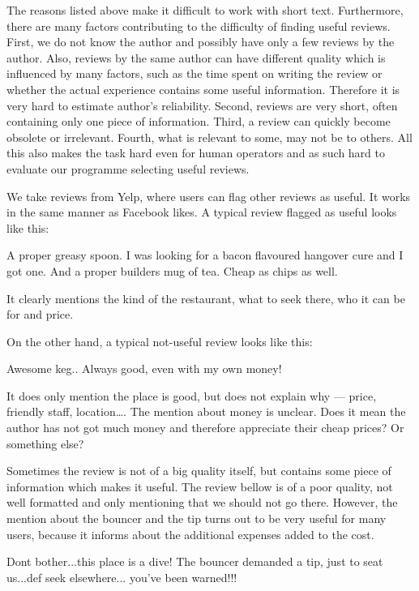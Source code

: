 The reasons listed above make it difficult to work with short text.
Furthermore, there are many factors contributing to the difficulty of finding useful reviews.
First, we do not know the author and possibly have only a few reviews by the author.
Also, reviews by the same author can have different quality which is influenced by many factors,
such as the time spent on writing the review or whether the actual experience contains some useful information.
Therefore it is very hard to estimate author's reliability.
Second, reviews are very short, often containing only one piece of information.
Third, a review can quickly become obsolete or irrelevant.
Fourth, what is relevant to some, may not be to others.
All this also makes the task hard even for human operators and as such hard to evaluate our programme selecting useful reviews.

We take reviews from Yelp, where users can flag other reviews as useful.
It works in the same manner as Facebook likes.
A typical review flagged as useful looks like this:

\begin{code}
A proper greasy spoon.
I was looking for a bacon flavoured hangover cure and I got one.
And a proper builders mug of tea.
Cheap as chips as well.
\end{code}

It clearly mentions the kind of the restaurant, what to seek there,
who it can be for and price.

On the other hand, a typical not-useful review looks like this:

\begin{code}
Awesome keg.. Always good, even with my own money!
\end{code}

It does only mention the place is good, but does not explain why --- price, friendly staff, location\dots.
The mention about money is unclear.
Does it mean the author has not got much money and therefore appreciate their cheap prices? Or something else?

Sometimes the review is not of a big quality itself, but contains some piece of information which makes it useful.
The review bellow is of a poor quality, not well formatted and only mentioning that we should not go there.
However, the mention about the bouncer and the tip turns out to be very useful for many users,
because it informs about the additional expenses added to the cost.

\begin{code}
Dont bother...this place is a dive!
The bouncer demanded a tip, just to seat us...def seek elsewhere...
you've been warned!!!
\end{code}

